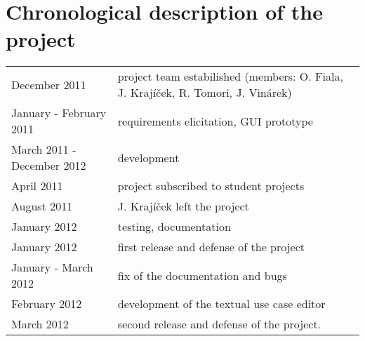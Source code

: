 \section{Chronological description of the project}

\begin{table}[ht]   %
\begin{center}
\begin{tabular}{ l p{7cm} }

December 2011 & project team estabilished (members: O. Fiala, J. Krajíček, R. Tomori, J. Vinárek)\\
January - February 2011 & requirements elicitation, GUI prototype\\
March 2011 - December 2012 & development\\
April 2011 & project subscribed to student projects\\
August 2011 & J. Krajíček left the project\\
January 2012 & testing, documentation\\
January 2012 & first release and defense of the project\\
January - March 2012 & fix of the documentation and bugs\\
February 2012 & development of the textual use case editor\\
March 2012 & second release and defense of the project.\\

\end{tabular}


\end{center}
\end{table}    
 